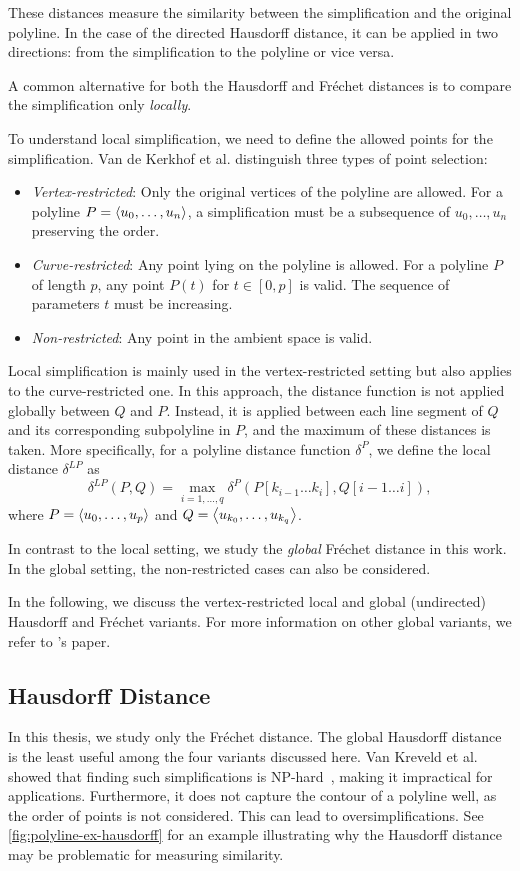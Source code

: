 These distances measure the similarity between the simplification and the original polyline. In the case of the directed Hausdorff distance, it can be applied in two directions: from the simplification to the polyline or vice versa.

A common alternative for both the Hausdorff and Fréchet distances is to compare the simplification only \emph{locally}.

To understand local simplification, we need to define the allowed points for the simplification. Van de Kerkhof et al. distinguish three types of point selection:
\begin{itemize}
  \item \emph{Vertex-restricted}: Only the original vertices of the polyline are allowed. For a polyline \(P = \left\langle u_0, \dots, u_n\right\rangle\), a simplification must be a subsequence of \(u_0, \dots, u_n\) preserving the order.
	\item \emph{Curve-restricted}: Any point lying on the polyline is allowed. For a polyline \(P\) of length \(p\), any point \(P(t)\) for \(t \in [0, p]\) is valid. The sequence of parameters \(t\) must be increasing.
	\item \emph{Non-restricted}: Any point in the ambient space is valid.
\end{itemize}

Local simplification is mainly used in the vertex-restricted setting but also applies to the curve-restricted one. In this approach, the distance function is not applied globally between \(Q\) and \(P\). Instead, it is applied between each line segment of \(Q\) and its corresponding subpolyline in \(P\), and the maximum of these distances is taken. More specifically, for a polyline distance function \(\delta^P\), we define the local distance \(\delta^{LP}\) as
\[\delta^{LP}(P, Q) = \max_{i = 1, \dots, q} \delta^P(P[k_{i-1}\dots k_i], Q[i-1 \dots i]),\]
where \(P = \left\langle u_0, \dots, u_p\right\rangle\) and \(Q = \left\langle u_{k_0}, \dots, u_{k_q}\right\rangle\).

In contrast to the local setting, we study the \emph{global} Fréchet distance in this work. In the global setting, the non-restricted cases can also be considered.

In the following, we discuss the vertex-restricted local and global (undirected) Hausdorff and Fréchet variants. For more information on other global variants, we refer to \citeauthor{global_curve_simplification}'s paper.

\subsection{Hausdorff Distance}
In this thesis, we study only the Fréchet distance. The global Hausdorff distance is the least useful among the four variants discussed here. Van Kreveld et al. showed that finding such simplifications is NP-hard~\cite{on_optimal_polyline_simplification_using_the_hausdorff_and_frechet_distance}, making it impractical for applications. Furthermore, it does not capture the contour of a polyline well, as the order of points is not considered. This can lead to oversimplifications. See \cref{fig:polyline-ex-hausdorff} for an example illustrating why the Hausdorff distance may be problematic for measuring similarity.

